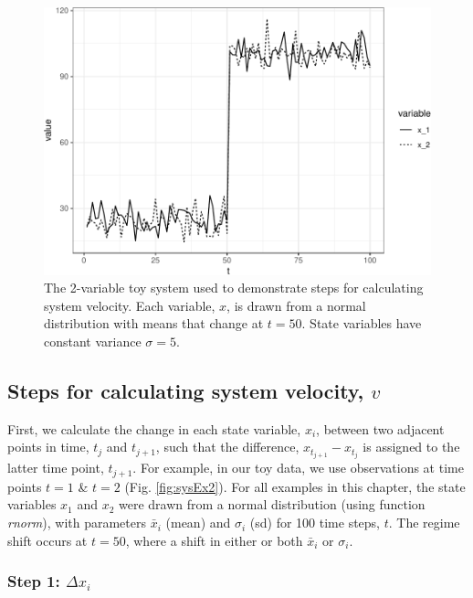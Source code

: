 \documentclass[12pt,twoside,openany]{reedthesis}
\begin{document}
\begin{figure}
\centering
\includegraphics{_myDissertation_files/figure-latex/sysEx-1.pdf}
\caption{\label{fig:sysEx}The 2-variable toy system used to demonstrate steps for calculating system velocity. Each variable, \(x\), is drawn from a normal distribution with means that change at \(t = 50\). State variables have constant variance \(\sigma = 5\).}
\end{figure}
\hypertarget{steps-for-calculating-system-velocity-v}{%
\subsection{\texorpdfstring{Steps for calculating system velocity, \(v\)}{Steps for calculating system velocity, v}}\label{steps-for-calculating-system-velocity-v}}

First, we calculate the change in each state variable, \(x_i\), between two adjacent points in time, \(t_j\) and \(t_{j+1}\), such that the difference, \(x_{t_{j+1}} - x_{t_j}\) is assigned to the latter time point, \(t_{j+1}\). For example, in our toy data, we use observations at time points \(t = 1\) \& \(t=2\) (Fig. \ref{fig:sysEx2}). For all examples in this chapter, the state variables \(x_1\) and \(x_2\) were drawn from a normal distribution (using function \emph{rnorm}), with parameters \(\bar{x}_i\) (mean) and \(\sigma_i\) (sd) for 100 time steps, \(t\). The regime shift occurs at \(t=50\), where a shift in either or both \(\bar{x}_i\) or \(\sigma_i\).

\hypertarget{step-1-delta-x_i}{%
\subsubsection{\texorpdfstring{Step 1: \(\Delta x_i\)}{Step 1: \textbackslash{}Delta x\_i}}\label{step-1-delta-x_i}}
\end{document}
